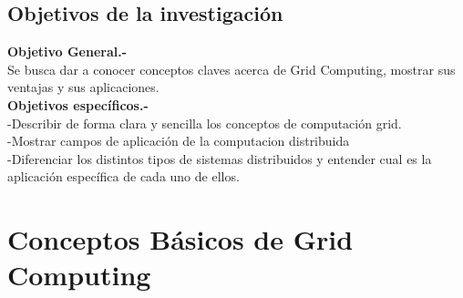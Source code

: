 \documentclass[12pt]{article}
\begin{document}
{\subsection{Objetivos de la investigaci\'on}
{\raggedright
\textbf{Objetivo General.-} \\\vspace{0.15in}Se busca dar a conocer conceptos claves acerca de Grid Computing, mostrar sus ventajas y sus aplicaciones.\\
\vspace{0.8in}
\textbf{Objetivos espec\'ificos.-} \\\vspace{0.15in}-Describir de forma clara y sencilla los conceptos de computaci\'on grid.\\
\vspace{0.2in}-Mostrar campos de aplicaci\'on de la computacion distribuida\\
\vspace{0.2in}-Diferenciar los distintos tipos de sistemas distribuidos y entender cual es la \\\hspace{-2.4in}aplicaci\'on espec\'ifica de cada uno de ellos.
}

\newpage
{\raggedright
\section{Conceptos B\'asicos de Grid Computing}
}}
\end{document}
